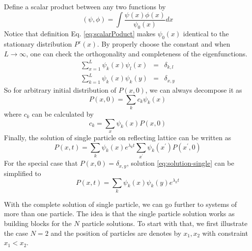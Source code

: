 \documentclass[12pt,a4paper]{article}
\begin{document}
Define a scalar product between any two functions by 
\begin{equation} \label{eq:scalarPoduct} (\psi, \phi) =
    \int\frac{\psi(x)\phi(x)}{\psi_{0}(x)}dx 
\end{equation}
Notice that definition Eq. \eqref{eq:scalarPoduct} makes $\psi_0(x)$ identical
to the stationary distribution $P^e(x)$.
By properly choose the constant and when $L\rightarrow\infty$,
one can check the orthogonality and completeness of the eigenfunctions.
\begin{eqnarray}
    \label{eq:orthogonality}
    \sum_{x=1}^L \psi_k(x)\psi_l(x) & = & \delta_{k,l} \\
    \label{eq:completeness}
    \sum_{k=1}^L \psi_k(x)\psi_k(y) & = & \delta_{x,y} 
\end{eqnarray}
So for arbitrary initial distribution of $P(x, 0)$, we can always decompose it as 
\begin{equation}
    \label{eq:decompose-intial-single}
    P(x,0) = \sum_k{c_k \psi_k(x)}
\end{equation}
where $c_k$ can be calculated by 
\begin{equation}
    \label{eq:coeff-k}
    c_k = \sum_x{\psi_k(x) P(x,0)}
\end{equation}
Finally, the solution of single particle on reflecting lattice can be written as
\begin{equation}
    \label{eq:solution-single}
    P(x,t) = \sum_k{\psi_k(x)e^{\lambda_k
            t}}\sum_{x^\prime}{\psi_k(x^\prime)P(x^\prime,0)}
\end{equation}
For the special case that $P(x,0) = \delta_{x,y}$, solution
\eqref{eq:solution-single} can be simplified to
\begin{equation}
    \label{eq:solution-single-simplified}
    P(x,t) = \sum_k{\psi_k(x)\psi_k(y)e^{\lambda_k t}}
\end{equation}

With the complete solution of single particle, we can go further to systems of
more than one particle. The idea is that the single particle solution works as
building blocks for the $N$ particle solutions. To start with that, we first
illustrate the case $N=2$ and the position of particles are denotes by $x_1,
x_2$ with constraint $x_1<x_2$.
\end{document}

